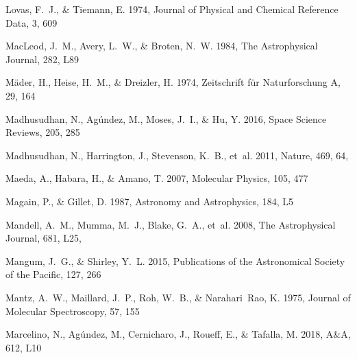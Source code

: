 \documentclass[twocolumn]{aastex631}
\begin{document}
\begin{thebibliography}{}
Lovas, F.~J., \& Tiemann, E. 1974, Journal of Physical and Chemical Reference
  Data, 3, 609

MacLeod, J.~M., Avery, L.~W., \& Broten, N.~W. 1984, The Astrophysical Journal,
  282, L89

M{\"a}der, H., Heise, H.~M., \& Dreizler, H. 1974, Zeitschrift f{\"u}r
  Naturforschung A, 29, 164

Madhusudhan, N., Ag{\'u}ndez, M., Moses, J.~I., \& Hu, Y. 2016, Space Science
  Reviews, 205, 285

{Madhusudhan}, N., {Harrington}, J., {Stevenson}, K.~B., {et~al.} 2011, Nature,
  469, 64, 

Maeda, A., Habara, H., \& Amano, T. 2007, Molecular Physics, 105, 477

{Magain}, P., \& {Gillet}, D. 1987, Astronomy and Astrophysics, 184, L5

{Mandell}, A.~M., {Mumma}, M.~J., {Blake}, G.~A., {et~al.} 2008, The
  Astrophysical Journal, 681, L25, 

Mangum, J.~G., \& Shirley, Y.~L. 2015, Publications of the Astronomical Society
  of the Pacific, 127, 266

Mantz, A.~W., Maillard, J.~P., Roh, W.~B., \& Narahari~Rao, K. 1975, Journal of
  Molecular Spectroscopy, 57, 155

Marcelino, N., Ag{\'u}ndez, M., Cernicharo, J., Roueff, E., \& Tafalla, M.
  2018, A{\&}A, 612, L10


\end{thebibliography}
\end{document}
